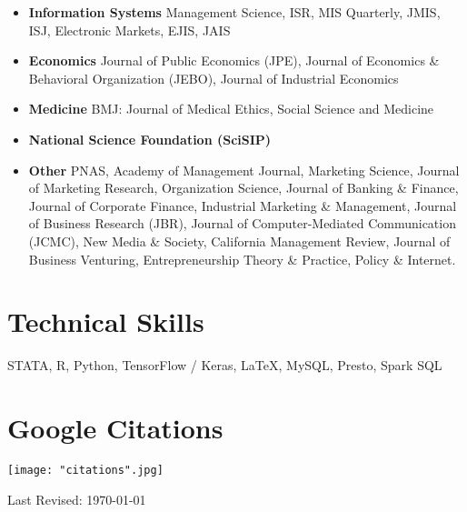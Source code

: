 \documentclass[10.5pt,letterpaper,sans]{moderncv}        %
\begin{document}
\begin{itemize}
  \item \textbf{Information Systems} \newline 
  Management Science, ISR, MIS Quarterly, JMIS, ISJ, Electronic Markets, EJIS, JAIS
  \item \textbf{Economics} \newline
  Journal of Public Economics (JPE), Journal of Economics \& Behavioral Organization (JEBO), Journal of Industrial Economics
\item \textbf{Medicine} \newline
 BMJ: Journal of Medical Ethics, Social Science and Medicine
 \item \textbf{National Science Foundation (SciSIP)}
  \item \textbf{Other} \newline 
PNAS, Academy of Management Journal, Marketing Science, Journal of Marketing Research, Organization Science, Journal of Banking \& Finance, Journal of Corporate Finance, Industrial Marketing \& Management, Journal of Business Research (JBR), Journal of Computer-Mediated Communication (JCMC), New Media \& Society, California Management Review, Journal of Business Venturing, Entrepreneurship Theory \& Practice, Policy \& Internet.
\end{itemize}

\section{Technical Skills}

STATA, R, Python, TensorFlow / Keras, \LaTeX, MySQL, Presto, Spark SQL\newline

\section{Google Citations}

\begin{minipage}{.5\linewidth}
   \texttt{[image: "citations".jpg]}
\end{minipage}

\bigskip

Last Revised: \today
\end{document}
